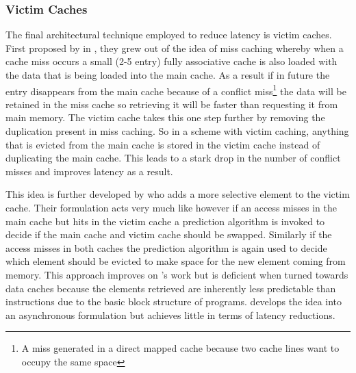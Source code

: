 \subsubsection{Victim Caches}

The final architectural technique employed to reduce latency is victim caches. First proposed by \citet{jouppiImprovingDirectmappedCache1990} in \citeyear{jouppiImprovingDirectmappedCache1990}, they grew out of the idea of miss caching whereby when a cache miss occurs a small (2-5 entry) fully associative cache is also loaded with the data that is being loaded into the main cache. As a result if in future the entry disappears from the main cache because of a conflict miss\footnote{A miss generated in a direct mapped cache because two cache lines want to occupy the same space} the data will be retained in the miss cache so retrieving it will be faster than requesting it from main memory. The victim cache takes this one step further by removing the duplication present in miss caching. So in a scheme with victim caching, anything that is evicted from the main cache is stored in the victim cache instead of duplicating the main cache. This leads to a stark drop in the number of conflict misses and improves latency as a result. 

This idea is further developed by \cite{stiliadisSelectiveVictimCaching1997} who adds a more selective element to the victim cache. Their formulation acts very much like \citeauthor{jouppiImprovingDirectmappedCache1990} however if an access misses in the main cache but hits in the victim cache a prediction algorithm is invoked to decide if the main cache and victim cache should be swapped. Similarly if the access misses in both caches the prediction algorithm is again used to decide which element should be evicted to make space for the new element coming from memory. This approach improves on \citeauthor{jouppiImprovingDirectmappedCache1990}'s work but is deficient when turned towards data caches because the elements retrieved are inherently less predictable than instructions due to the basic block structure of programs. \citet{hormdeeAsynchronousVictimCache2002} develops the idea into an asynchronous formulation but achieves little in terms of latency reductions.

